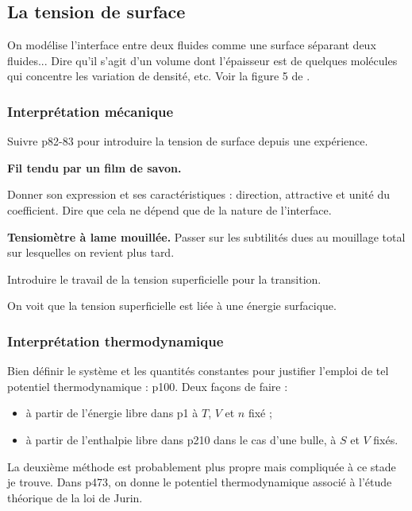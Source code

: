 \subsection{La tension de surface}

On modélise l'interface entre deux fluides comme une surface séparant deux fluides...
Dire qu'il s'agit d'un volume dont l'épaisseur est de quelques molécules qui concentre les variation de densité, etc.
Voir la figure 5 de \cite{Marchand2011}.

\subsubsection{Interprétation mécanique}

Suivre \cite{Diu2008} p82-83 pour introduire la tension de surface depuis une expérience.

\begin{experience}
\textbf{Fil tendu par un film de savon.}
\end{experience}

Donner son expression et ses caractéristiques : direction, attractive et unité du coefficient.
Dire que cela ne dépend que de la nature de l'interface.

\begin{experience}
\textbf{Tensiomètre à lame mouillée.}
Passer sur les subtilités dues au mouillage total sur lesquelles on revient plus tard.
\end{experience}

Introduire le travail de la tension superficielle pour la transition.

\begin{transition}
On voit que la tension superficielle est liée à une énergie surfacique.
\end{transition}

\subsubsection{Interprétation thermodynamique}

Bien définir le système et les quantités constantes pour justifier l'emploi de tel potentiel thermodynamique : \cite{Graner2011} p100.
Deux façons de faire :
\begin{itemize}
\item à partir de l'énergie libre dans \cite{Marchand2011} p1 à $T$, $V$ et $n$ fixé ;
\item à partir de l'enthalpie libre dans \cite{Diu2008} p210 dans le cas d'une bulle, à $S$ et $V$ fixés.
\end{itemize}
La deuxième méthode est probablement plus propre mais compliquée à ce stade je trouve.
Dans \cite{Fruchart2016} p473, on donne le potentiel thermodynamique associé à l'étude théorique de la loi de Jurin.

